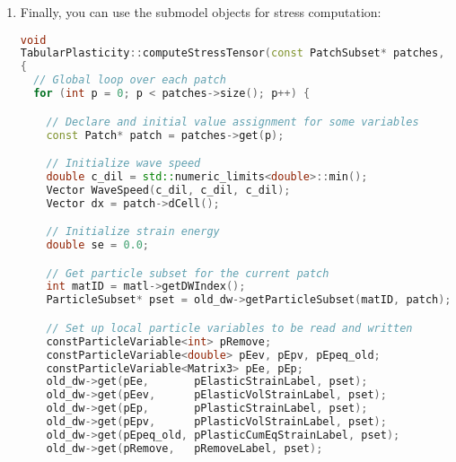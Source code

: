 \begin{enumerate}
\begin{lstlisting}[language=Cpp]
  // Add yield Function computes and requires
  d_yield->addComputesAndRequires(task, matl, patches);

  // Add internal variable computes and requires
  task->requires(Task::OldDW, pElasticStrainLabel, matlset, Ghost::None);
  task->requires(Task::OldDW, pElasticVolStrainLabel, matlset, Ghost::None);
  task->requires(Task::OldDW, pPlasticStrainLabel, matlset, Ghost::None);
  task->requires(Task::OldDW, pPlasticCumEqStrainLabel, matlset, Ghost::None);
  task->requires(Task::OldDW, pPlasticVolStrainLabel, matlset, Ghost::None);
  task->requires(Task::OldDW, pRemoveLabel, matlset, Ghost::None);

  task->computes(pElasticStrainLabel_preReloc, matlset);
  task->computes(pElasticVolStrainLabel_preReloc, matlset);
  task->computes(pPlasticStrainLabel_preReloc, matlset);
  task->computes(pPlasticCumEqStrainLabel_preReloc, matlset);
  task->computes(pPlasticVolStrainLabel_preReloc, matlset);
  task->computes(pRemoveLabel_preReloc, matlset);
}
\end{lstlisting}

  \item Finally, you can use the submodel objects for stress computation:
\begin{lstlisting}[language=Cpp]
void
TabularPlasticity::computeStressTensor(const PatchSubset* patches, const MPMMaterial* matl, DataWarehouse* old_dw, DataWarehouse* new_dw)
{
  // Global loop over each patch
  for (int p = 0; p < patches->size(); p++) {

    // Declare and initial value assignment for some variables
    const Patch* patch = patches->get(p);

    // Initialize wave speed
    double c_dil = std::numeric_limits<double>::min();
    Vector WaveSpeed(c_dil, c_dil, c_dil);
    Vector dx = patch->dCell();

    // Initialize strain energy
    double se = 0.0;

    // Get particle subset for the current patch
    int matID = matl->getDWIndex();
    ParticleSubset* pset = old_dw->getParticleSubset(matID, patch);

    // Set up local particle variables to be read and written
    constParticleVariable<int> pRemove;
    constParticleVariable<double> pEev, pEpv, pEpeq_old;
    constParticleVariable<Matrix3> pEe, pEp;
    old_dw->get(pEe,       pElasticStrainLabel, pset);
    old_dw->get(pEev,      pElasticVolStrainLabel, pset);
    old_dw->get(pEp,       pPlasticStrainLabel, pset);
    old_dw->get(pEpv,      pPlasticVolStrainLabel, pset);
    old_dw->get(pEpeq_old, pPlasticCumEqStrainLabel, pset);
    old_dw->get(pRemove,   pRemoveLabel, pset);


\end{lstlisting}
\end{enumerate}
